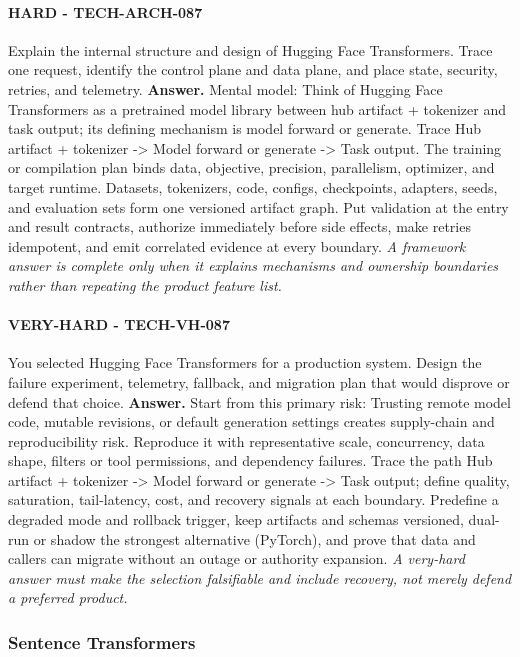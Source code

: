 \paragraph{HARD - TECH-ARCH-087} Explain the internal structure and design of Hugging Face Transformers. Trace one request, identify the control plane and data plane, and place state, security, retries, and telemetry.
\textbf{Answer.} Mental model: Think of Hugging Face Transformers as a pretrained model library between hub artifact + tokenizer and task output; its defining mechanism is model forward or generate. Trace Hub artifact + tokenizer -> Model forward or generate -> Task output. The training or compilation plan binds data, objective, precision, parallelism, optimizer, and target runtime. Datasets, tokenizers, code, configs, checkpoints, adapters, seeds, and evaluation sets form one versioned artifact graph. Put validation at the entry and result contracts, authorize immediately before side effects, make retries idempotent, and emit correlated evidence at every boundary.
\textit{A framework answer is complete only when it explains mechanisms and ownership boundaries rather than repeating the product feature list.}
\paragraph{VERY-HARD - TECH-VH-087} You selected Hugging Face Transformers for a production system. Design the failure experiment, telemetry, fallback, and migration plan that would disprove or defend that choice.
\textbf{Answer.} Start from this primary risk: Trusting remote model code, mutable revisions, or default generation settings creates supply-chain and reproducibility risk. Reproduce it with representative scale, concurrency, data shape, filters or tool permissions, and dependency failures. Trace the path Hub artifact + tokenizer -> Model forward or generate -> Task output; define quality, saturation, tail-latency, cost, and recovery signals at each boundary. Predefine a degraded mode and rollback trigger, keep artifacts and schemas versioned, dual-run or shadow the strongest alternative (PyTorch), and prove that data and callers can migrate without an outage or authority expansion.
\textit{A very-hard answer must make the selection falsifiable and include recovery, not merely defend a preferred product.}
\subsubsection*{Sentence Transformers}

